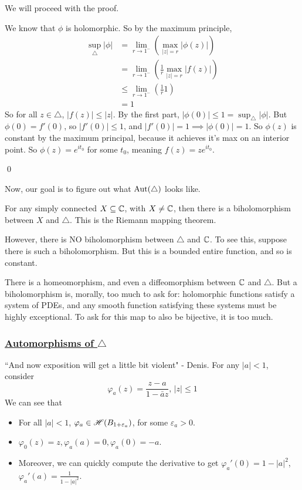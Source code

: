 \documentclass[x11names,reqno,14pt]{extarticle}
\newcommand{\bigt}{\bigtriangleup}
\begin{document}
We will proceed with the proof.

We know that $\phi$ is holomorphic. So by the maximum principle, 
\begin{align*}
\sup_{\bigtriangleup}|\phi| & = \lim_{r\to1^-}\left(\max_{|z| = r}|\phi(z)|\right) \\
& = \lim_{r\to1^-}\left(\frac{1}{r}\max_{|z|=r}|f(z)|\right) \\
& \leq \lim_{r\to1^-}(\frac{1}{r}1) \\
& = 1
\end{align*}
So for all $z \in \bigtriangleup$, $|f(z)| \leq |z|$. By the first part, $|\phi(0)| \leq 1 = \sup_{\bigtriangleup}|\phi|$. But $\phi(0) = f'(0)$, so $|f'(0)| \leq 1$, and $|f'(0)| = 1 \implies |\phi(0)| = 1$. So $\phi(z)$ is constant by the maximum principal, because it achieves it's max on an interior point. So $\phi(z) = e^{it_0}$ for some $t_0$, meaning $f(z) = ze^{it_0}$. 

\qed

Now, our goal is to figure out what $\Aut(\bigt)$ looks like. 

\rem

For any simply connected $X \subseteq \mathbb{C}$, with $X\neq\mathbb{C}$, then there is a biholomorphism between $X$ and $\bigt$. This is the Riemann mapping theorem. 

However, there is NO biholomorphism between $\bigt$ and $\mathbb{C}$. To see this, suppose there is such a biholomorphism. But this is a bounded entire function, and so is constant. 

There is a homeomorphism, and even a diffeomorphism between $\mathbb{C}$ and $\bigt$. But a biholomorphism is, morally, too much to ask for: holomorphic functions satisfy a system of PDEs, and any smooth function satisfying these systems must be highly exceptional. To ask for this map to also be bijective, it is too much. 

\subsubsection*{\underline{Automorphisms of $\bigt$}}

``And now exposition will get a little bit violent" - Denis.
For any $|a| < 1$, consider 
\[
\varphi_a(z) = \frac{z - a}{1 - \bar{a}z}, \, |z| \leq 1
\]
We can see that 
\begin{itemize}
\item For all $|a| < 1$, $\varphi_a \in \mathscr{H}(B_{1 + \varepsilon_a})$, for some $\varepsilon_a > 0$. 
\item $\varphi_0(z) = z, \varphi_a(a) = 0, \varphi_a(0) = - a$. 
\item Moreover, we can quickly compute the derivative to get $\varphi_a'(0) = 1 - |a|^2$, $\varphi_a'(a) = \frac{1}{1 - |a|^2}$. 
\end{itemize}
\end{document}
